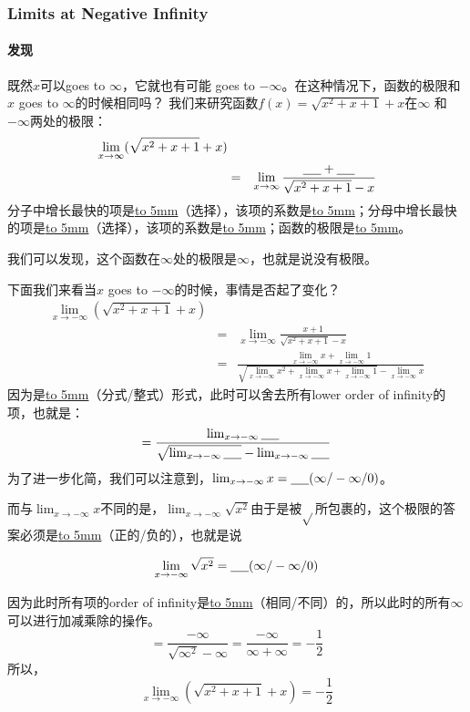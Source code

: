 \documentclass[UTF8]{ctexart}
\begin{document}
\subsubsection{Limits at Negative Infinity}
\paragraph{发现}
既然$x$可以goes to $\infty$，它就也有可能 goes to $-\infty$。在这种情况下，函数的极限和$x$ goes to $\infty$的时候相同吗？
我们来研究函数$f(x) = \sqrt{x^2+x+1} + x $在$\infty$ 和 $-\infty$两处的极限：
\begin{eqnarray*}
{\lim_{x \to \infty} (\sqrt{x^2+x+1} + x)} \\
& = & {\lim_{x \to \infty} \frac{\underline{\hbox to 5mm{}}+\underline{\hbox to 5mm{}}}{\sqrt{x^2+x+1} - x}}
\end{eqnarray*}
分子中增长最快的项是\underline{\hbox to 5mm{}}（选择），该项的系数是\underline{\hbox to 5mm{}}；分母中增长最快的项是\underline{\hbox to 5mm{}}（选择），该项的系数是\underline{\hbox to 5mm{}}；函数的极限是\underline{\hbox to 5mm{}}。

我们可以发现，这个函数在$\infty$处的极限是$\infty$，也就是说没有极限。

下面我们来看当$x$ goes to $-\infty$的时候，事情是否起了变化？
 \begin{eqnarray*}
{\lim_{x \to -\infty} (\sqrt{x^2+x+1} + x)} \\
& = & {\lim_{x \to -\infty} \frac{x+1}{\sqrt{x^2+x+1} - x}}\\
& = & \frac{{\lim_{x \to -\infty} x}+{\lim_{x \to -\infty} 1}}{\sqrt{{\lim_{x \to -\infty} x^2}+{\lim_{x \to -\infty} x}+{\lim_{x \to -\infty} 1}}-{\lim_{x \to -\infty} x}} 
\end{eqnarray*}
因为是\underline{\hbox to 5mm{}}（分式/整式）形式，此时可以舍去所有lower order of infinity的项，也就是：
\[ = \frac{{\lim_{x \to -\infty} \underline{\hbox to 5mm{}}}}{\sqrt{{\lim_{x \to -\infty} \underline{\hbox to 5mm{}}}}-{\lim_{x \to -\infty} \underline{\hbox to 5mm{}}}}\]
为了进一步化简，我们可以注意到，${\lim_{x \to -\infty} x} = \underline{\hbox to 5mm{}}(\infty / -\infty / 0)$。

而与${\lim_{x \to -\infty} x}$不同的是，${\lim_{x \to -\infty} \sqrt{x^2}}$由于是被$\sqrt{ }$所包裹的，这个极限的答案必须是\underline{\hbox to 5mm{}}（正的/负的），也就是说

\[ {\lim_{x \to -\infty} \sqrt{x^2}} = \underline{\hbox to 5mm{}}(\infty / -\infty/ 0)\]

因为此时所有项的order of infinity是\underline{\hbox to 5mm{}}（相同/不同）的，所以此时的所有$\infty$可以进行加减乘除的操作。
\[ = \frac{-\infty}{\sqrt{\infty^2} - \infty} = \frac{-\infty}{\infty + \infty} = -\frac{1}{2}\]
所以，
\[{\lim_{x \to -\infty} (\sqrt{x^2+x+1} + x)} = -\frac{1}{2} \]
\end{document}
